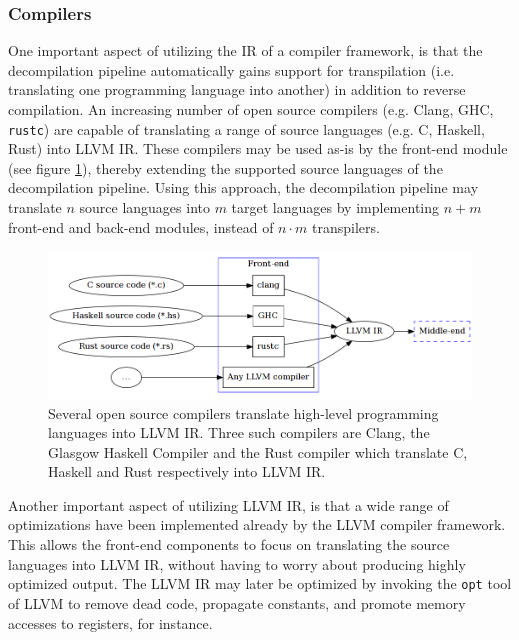 
\subsubsection{Compilers}
\label{sec:design_compilers}

One important aspect of utilizing the IR of a compiler framework, is that the decompilation pipeline automatically gains support for transpilation (i.e. translating one programming language into another) in addition to reverse compilation. An increasing number of open source compilers (e.g. Clang, GHC, \texttt{rustc}) are capable of translating a range of source languages (e.g. C, Haskell, Rust) into LLVM IR. These compilers may be used as-is by the front-end module (see figure \ref{fig:front-end_source}), thereby extending the supported source languages of the decompilation pipeline. Using this approach, the decompilation pipeline may translate $ n $ source languages into $ m $ target languages by implementing $ n + m $ front-end and back-end modules, instead of $ n \cdot m $ transpilers.

\begin{figure}[htbp]
	\begin{center}
		\includegraphics[width=\textwidth]{inc/6_design/front-end_source.png}
		\caption{Several open source compilers translate high-level programming languages into LLVM IR. Three such compilers are Clang, the Glasgow Haskell Compiler and the Rust compiler which translate C, Haskell and Rust respectively into LLVM IR.}
		\label{fig:front-end_source}
	\end{center}
\end{figure}

Another important aspect of utilizing LLVM IR, is that a wide range of optimizations have been implemented already by the LLVM compiler framework. This allows the front-end components to focus on translating the source languages into LLVM IR, without having to worry about producing highly optimized output. The LLVM IR may later be optimized by invoking the \texttt{opt} tool of LLVM to remove dead code, propagate constants, and promote memory accesses to registers, for instance.
